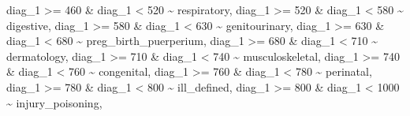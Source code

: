 \documentclass[
]{article}
\newenvironment{Shaded}{\begin{snugshade}}{\end{snugshade}}
\newcommand{\DecValTok}[1]{\textcolor[rgb]{0.00,0.00,0.81}{#1}}
\newcommand{\NormalTok}[1]{#1}
\newcommand{\SpecialCharTok}[1]{\textcolor[rgb]{0.00,0.00,0.00}{#1}}
\newcommand{\StringTok}[1]{\textcolor[rgb]{0.31,0.60,0.02}{#1}}
\begin{document}
\begin{Shaded}
\begin{Highlighting}[]
\NormalTok{      diag\_1 }\SpecialCharTok{\textgreater{}=} \DecValTok{460} \SpecialCharTok{\&}\NormalTok{ diag\_1 }\SpecialCharTok{\textless{}} \DecValTok{520} \SpecialCharTok{\textasciitilde{}} \StringTok{\textquotesingle{}respiratory\textquotesingle{}}\NormalTok{,}
\NormalTok{      diag\_1 }\SpecialCharTok{\textgreater{}=} \DecValTok{520} \SpecialCharTok{\&}\NormalTok{ diag\_1 }\SpecialCharTok{\textless{}} \DecValTok{580} \SpecialCharTok{\textasciitilde{}} \StringTok{\textquotesingle{}digestive\textquotesingle{}}\NormalTok{,}
\NormalTok{      diag\_1 }\SpecialCharTok{\textgreater{}=} \DecValTok{580} \SpecialCharTok{\&}\NormalTok{ diag\_1 }\SpecialCharTok{\textless{}} \DecValTok{630} \SpecialCharTok{\textasciitilde{}} \StringTok{\textquotesingle{}genitourinary\textquotesingle{}}\NormalTok{,}
\NormalTok{      diag\_1 }\SpecialCharTok{\textgreater{}=} \DecValTok{630} \SpecialCharTok{\&}\NormalTok{ diag\_1 }\SpecialCharTok{\textless{}} \DecValTok{680} \SpecialCharTok{\textasciitilde{}} \StringTok{\textquotesingle{}preg\_birth\_puerperium\textquotesingle{}}\NormalTok{,}
\NormalTok{      diag\_1 }\SpecialCharTok{\textgreater{}=} \DecValTok{680} \SpecialCharTok{\&}\NormalTok{ diag\_1 }\SpecialCharTok{\textless{}} \DecValTok{710} \SpecialCharTok{\textasciitilde{}} \StringTok{\textquotesingle{}dermatology\textquotesingle{}}\NormalTok{,}
\NormalTok{      diag\_1 }\SpecialCharTok{\textgreater{}=} \DecValTok{710} \SpecialCharTok{\&}\NormalTok{ diag\_1 }\SpecialCharTok{\textless{}} \DecValTok{740} \SpecialCharTok{\textasciitilde{}} \StringTok{\textquotesingle{}musculoskeletal\textquotesingle{}}\NormalTok{,}
\NormalTok{      diag\_1 }\SpecialCharTok{\textgreater{}=} \DecValTok{740} \SpecialCharTok{\&}\NormalTok{ diag\_1 }\SpecialCharTok{\textless{}} \DecValTok{760} \SpecialCharTok{\textasciitilde{}} \StringTok{\textquotesingle{}congenital\textquotesingle{}}\NormalTok{,}
\NormalTok{      diag\_1 }\SpecialCharTok{\textgreater{}=} \DecValTok{760} \SpecialCharTok{\&}\NormalTok{ diag\_1 }\SpecialCharTok{\textless{}} \DecValTok{780} \SpecialCharTok{\textasciitilde{}} \StringTok{\textquotesingle{}perinatal\textquotesingle{}}\NormalTok{,}
\NormalTok{      diag\_1 }\SpecialCharTok{\textgreater{}=} \DecValTok{780} \SpecialCharTok{\&}\NormalTok{ diag\_1 }\SpecialCharTok{\textless{}} \DecValTok{800} \SpecialCharTok{\textasciitilde{}} \StringTok{\textquotesingle{}ill\_defined\textquotesingle{}}\NormalTok{,}
\NormalTok{      diag\_1 }\SpecialCharTok{\textgreater{}=} \DecValTok{800} \SpecialCharTok{\&}\NormalTok{ diag\_1 }\SpecialCharTok{\textless{}} \DecValTok{1000} \SpecialCharTok{\textasciitilde{}} \StringTok{\textquotesingle{}injury\_poisoning\textquotesingle{}}\NormalTok{,}

\end{Highlighting}
\end{Shaded}
\end{document}

